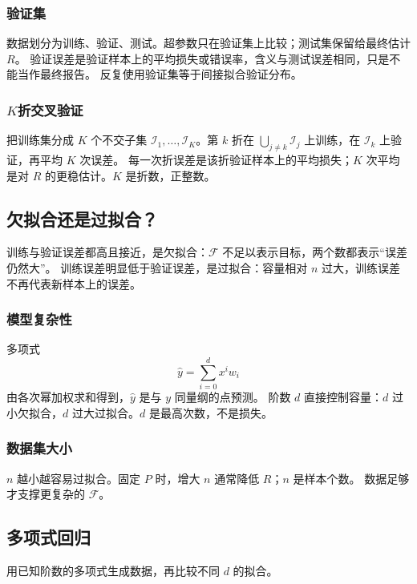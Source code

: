 \subsubsection{验证集}

数据划分为训练、验证、测试。超参数只在验证集上比较；测试集保留给最终估计 $R$。
验证误差是验证样本上的平均损失或错误率，含义与测试误差相同，只是不能当作最终报告。
反复使用验证集等于间接拟合验证分布。

\subsubsection{\texorpdfstring{$K$折交叉验证}{K折交叉验证}}

把训练集分成 $K$ 个不交子集 $\mathcal{I}_{1},\ldots,\mathcal{I}_{K}$。第 $k$ 折在
$\bigcup_{j\neq k}\mathcal{I}_{j}$ 上训练，在 $\mathcal{I}_{k}$ 上验证，再平均 $K$ 次误差。
每一次折误差是该折验证样本上的平均损失；$K$ 次平均是对 $R$ 的更稳估计。$K$ 是折数，正整数。

\subsection{欠拟合还是过拟合？}

训练与验证误差都高且接近，是欠拟合：$\mathcal{F}$ 不足以表示目标，两个数都表示“误差仍然大”。
训练误差明显低于验证误差，是过拟合：容量相对 $n$ 过大，训练误差不再代表新样本上的误差。

\subsubsection{模型复杂性}

多项式
\[
\hat{y}=\sum_{i=0}^{d}x^{i}w_{i}
\]
由各次幂加权求和得到，$\hat{y}$ 是与 $y$ 同量纲的点预测。
阶数 $d$ 直接控制容量：$d$ 过小欠拟合，$d$ 过大过拟合。$d$ 是最高次数，不是损失。

\subsubsection{数据集大小}

$n$ 越小越容易过拟合。固定 $P$ 时，增大 $n$ 通常降低 $R$；$n$ 是样本个数。
数据足够才支撑更复杂的 $\mathcal{F}$。

\subsection{多项式回归}

用已知阶数的多项式生成数据，再比较不同 $d$ 的拟合。

